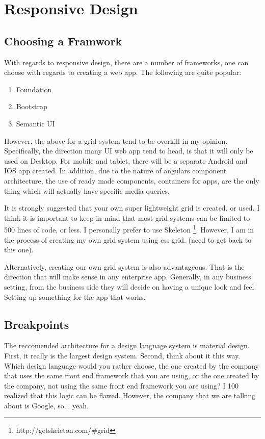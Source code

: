 \chapter{ Responsive Design }

\section{ Choosing a Framwork }
With regards to responsive design, there are a number of frameworks, one can
choose with regards to creating a web app. The following are quite popular:
\begin{enumerate}
  \item Foundation
  \item Bootstrap
  \item Semantic UI
\end{enumerate}

However, the above for a grid system tend to be overkill in my opinion.
Specifically, the direction many UI web app tend to head, is that it will only
be used on Desktop. For mobile and tablet, there will be a separate Android and
IOS app created. In addition, due to the nature of angulars component
architecture, the use of ready made components, containers for apps, are the
only thing which will actually have specific media queries.

It is strongly suggested that your own super lightweight grid is created, or
used. I think it is important to keep in mind that most grid systems can be
limited to 500 lines of code, or less. I personally prefer to use Skeleton
\footnote{http://getskeleton.com/\#grid}. However, I am in the process of
creating my own grid system using css-grid. (need to get back to this one).

Alternatively, creating our own grid system is also advantageous. That is the
direction that will make sense in any enterprise app. Generally, in any business
setting, from the business side they will decide on having a unique look and
feel. Setting up something for the app that works.

\section{ Breakpoints }
The reccomended architecture for a design language system is material design.
First, it really is the largest design system. Second, think about it this way.
Which design language would you rather choose, the one created by the company
that uses the same front end framework that you are using, or the one created
by the company, not using the same front end framework you are using? I 100%
realized that this logic can be flawed. However, the company that we are talking
about is Google, so... yeah.


